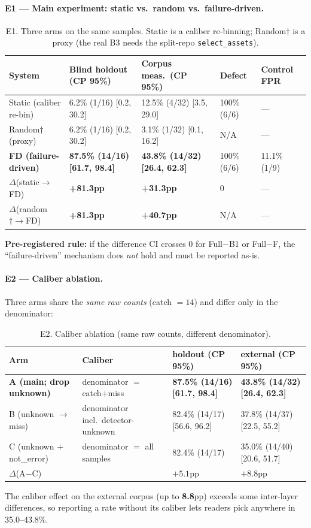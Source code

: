 \documentclass{article}
\begin{document}
\paragraph{E1 --- Main experiment: static vs.\ random vs.\ failure-driven.}
\begin{table}[t]
\caption{E1. Three arms on the same samples. Static is a caliber re-binning; Random$\dagger$ is a
proxy (the real B3 needs the split-repo \texttt{select\_assets}).}
\label{tab:e1}
\centering
\small
\begin{tabular}{@{}lp{2.7cm}p{2.4cm}p{1.7cm}p{1.5cm}@{}}
\toprule
System & Blind holdout (CP 95\%) & Corpus meas.\ (CP 95\%) & Defect & Control FPR \\
\midrule
Static (caliber re-bin) & 6.2\% (1/16) [0.2, 30.2] & 12.5\% (4/32) [3.5, 29.0] & 100\% (6/6) & --- \\
Random$\dagger$ (proxy) & 6.2\% (1/16) [0.2, 30.2] & 3.1\% (1/32) [0.1, 16.2] & N/A & --- \\
\textbf{FD (failure-driven)} & \textbf{87.5\% (14/16) [61.7, 98.4]} & \textbf{43.8\% (14/32) [26.4, 62.3]} & 100\% (6/6) & 11.1\% (1/9) \\
$\Delta$(static$\to$FD) & \textbf{+81.3pp} & \textbf{+31.3pp} & 0 & --- \\
$\Delta$(random$\dagger\to$FD) & \textbf{+81.3pp} & \textbf{+40.7pp} & N/A & --- \\
\bottomrule
\end{tabular}
\end{table}
\textbf{Pre-registered rule:} if the difference CI crosses 0 for Full$-$B1 or Full$-$F, the
``failure-driven'' mechanism does \emph{not} hold and must be reported as-is.

\paragraph{E2 --- Caliber ablation.} Three arms share the \emph{same raw counts} (catch $=14$) and
differ only in the denominator:
\begin{table}[t]
\caption{E2. Caliber ablation (same raw counts, different denominator).}
\label{tab:e2}
\centering
\small
\begin{tabular}{@{}lp{3.6cm}p{3.6cm}p{3.6cm}@{}}
\toprule
Arm & Caliber & holdout (CP 95\%) & external (CP 95\%) \\
\midrule
\textbf{A (main; drop unknown)} & denominator $=$ catch$+$miss & \textbf{87.5\% (14/16) [61.7, 98.4]} & \textbf{43.8\% (14/32) [26.4, 62.3]} \\
B (unknown $\to$ miss) & denominator incl.\ detector-unknown & 82.4\% (14/17) [56.6, 96.2] & 37.8\% (14/37) [22.5, 55.2] \\
C (unknown $+$ not\_error) & denominator $=$ all samples & 82.4\% (14/17) & 35.0\% (14/40) [20.6, 51.7] \\
\midrule
$\Delta$(A$-$C) & & $+5.1$pp & $\mathbf{+8.8}$pp \\
\bottomrule
\end{tabular}
\end{table}
The caliber effect on the external corpus (up to \textbf{8.8}pp) exceeds some inter-layer
differences, so reporting a rate without its caliber lets readers pick anywhere in 35.0--43.8\%.
\end{document}

